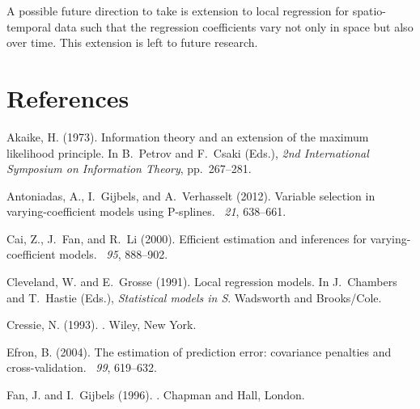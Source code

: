 \documentclass[authoryear,review, 12pt]{elsarticle}
\begin{document}
A possible future direction to take is extension to local regression for spatio-temporal data such that the regression coefficients vary not only in space but also over time. This extension is left to future research.


\section*{References}

\begin{thebibliography}{}

Akaike, H. (1973).
\newblock Information theory and an extension of the maximum likelihood
  principle.
\newblock In B.~Petrov and F.~Csaki (Eds.), {\em 2nd International Symposium on
  Information Theory}, pp.\  267--281.

Antoniadas, A., I.~Gijbels, and A.~Verhasselt (2012).
\newblock Variable selection in varying-coefficient models using {P}-splines.
~{\em 21},
  638--661.

Cai, Z., J.~Fan, and R.~Li (2000).
\newblock Efficient estimation and inferences for varying-coefficient models.
~{\em 95},
  888--902.

Cleveland, W. and E.~Grosse (1991).
\newblock Local regression models.
\newblock In J.~Chambers and T.~Hastie (Eds.), {\em Statistical models in S}.
  Wadsworth and Brooks/Cole.

Cressie, N. (1993).
.
\newblock Wiley, New York.

Efron, B. (2004).
\newblock The estimation of prediction error: covariance penalties and
  cross-validation.
~{\em 99},
  619--632.

Fan, J. and I.~Gijbels (1996).
.
\newblock Chapman and Hall, London.


\end{thebibliography}
\end{document}
